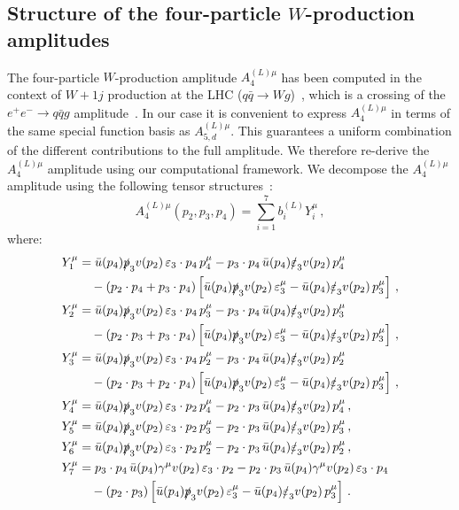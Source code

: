 \documentclass[main.tex]{subfiles}
\begin{document}
\subsection{Structure of the four-particle $W$-production amplitudes}
\label{wyjsec:B4amplitude}

The four-particle $W$-production amplitude $A_{4}^{(L)\mu}$ has been computed in the context of $W+1j$ production at the LHC ($q\bar{q} \to Wg$)~\cite{Gehrmann:2011ab}, which is a crossing of the $e^+ e^- \to q\bar{q}g$ amplitude~\cite{Garland:2002ak}. In our case it is convenient to express $A_{4}^{(L)\mu}$ in terms of the same special function basis as $A_{5,d}^{(L)\mu}$. This guarantees a uniform combination of the different contributions to the full amplitude. We therefore re-derive the $A_{4}^{(L)\mu}$ amplitude using our computational framework. We decompose the $A_{4}^{(L)\mu}$ amplitude using the following tensor structures~\cite{Garland:2002ak}:
\begin{equation}
A_{4}^{(L)\mu}(p_2,p_3,p_4) = \sum_{i=1}^{7} b_i^{(L)} Y_{i}^\mu \,,
\label{Wyjeq:B4decomposition}
\end{equation}
where:
\begin{align}
  Y_{1}^{\mu}  &= \bar{u}(p_4) \slashed{p}_3 v(p_2) \, \varepsilon_3 \cdot p_4 \, p_4^\mu 
                    -p_3 \cdot p_4 \, \bar{u}(p_4) \slashed{\varepsilon}_3 v(p_2) \, p_4^\mu \nonumber \\ 
                 & \quad -(p_2 \cdot p_4 + p_3 \cdot p_4) \left[\bar{u}(p_4) \slashed{p}_3 v(p_2) \, \varepsilon_3^\mu - \bar{u}(p_4) \slashed{\varepsilon}_3 v(p_2) \, p_3^\mu \right] \,, \nonumber \\ 
  Y_{2}^{\mu}  &= \bar{u}(p_4) \slashed{p}_3 v(p_2) \, \varepsilon_3 \cdot p_4 \, p_3^\mu 
                    -p_3 \cdot p_4 \, \bar{u}(p_4) \slashed{\varepsilon}_3 v(p_2) \, p_3^\mu \nonumber \\ 
                 & \quad -(p_2 \cdot p_3 + p_3 \cdot p_4) \left[\bar{u}(p_4) \slashed{p}_3 v(p_2) \, \varepsilon_3^\mu - \bar{u}(p_4) \slashed{\varepsilon}_3 v(p_2) \, p_3^\mu \right] \,, \nonumber \\ 
  Y_{3}^{\mu}  &= \bar{u}(p_4) \slashed{p}_3 v(p_2) \, \varepsilon_3 \cdot p_4 \, p_2^\mu 
                    -p_3 \cdot p_4 \, \bar{u}(p_4) \slashed{\varepsilon}_3 v(p_2) \, p_2^\mu \nonumber \\ 
                 & \quad -(p_2 \cdot p_3 + p_2 \cdot p_4) \left[\bar{u}(p_4) \slashed{p}_3 v(p_2) \, \varepsilon_3^\mu - \bar{u}(p_4) \slashed{\varepsilon}_3 v(p_2) \, p_3^\mu \right] \,, \label{Wyjeq:4ptDecomposition}\\
  Y_{4}^{\mu}  &= \bar{u}(p_4) \slashed{p}_3 v(p_2) \, \varepsilon_3 \cdot p_2 \, p_4^\mu 
                    -p_2 \cdot p_3 \, \bar{u}(p_4) \slashed{\varepsilon}_3 v(p_2) \, p_4^\mu \,, \nonumber \\ 
  Y_{5}^{\mu}  &= \bar{u}(p_4) \slashed{p}_3 v(p_2) \, \varepsilon_3 \cdot p_2 \, p_3^\mu 
                    -p_2 \cdot p_3 \, \bar{u}(p_4) \slashed{\varepsilon}_3 v(p_2) \, p_3^\mu \,, \nonumber \\ 
  Y_{6}^{\mu}  &= \bar{u}(p_4) \slashed{p}_3 v(p_2) \, \varepsilon_3 \cdot p_2 \, p_2^\mu 
                    -p_2 \cdot p_3 \, \bar{u}(p_4) \slashed{\varepsilon}_3 v(p_2) \, p_2^\mu \,, \nonumber \\ 
  Y_{7}^{\mu}  &=   p_3 \cdot p_4 \, \bar{u}(p_4) \gamma^\mu v(p_2) \, \varepsilon_3 \cdot p_2
                    - p_2 \cdot p_3 \, \bar{u}(p_4) \gamma^\mu v(p_2) \, \varepsilon_3 \cdot p_4 \nonumber \\ 
                 & \quad -(p_2 \cdot p_3) \left[ \bar{u}(p_4) \slashed{p}_3 v(p_2) \, \varepsilon_3^\mu  - \bar{u}(p_4) \slashed{\varepsilon}_3 v(p_2) \, p_3^\mu \right] \,. \nonumber
\end{align}
\end{document}
